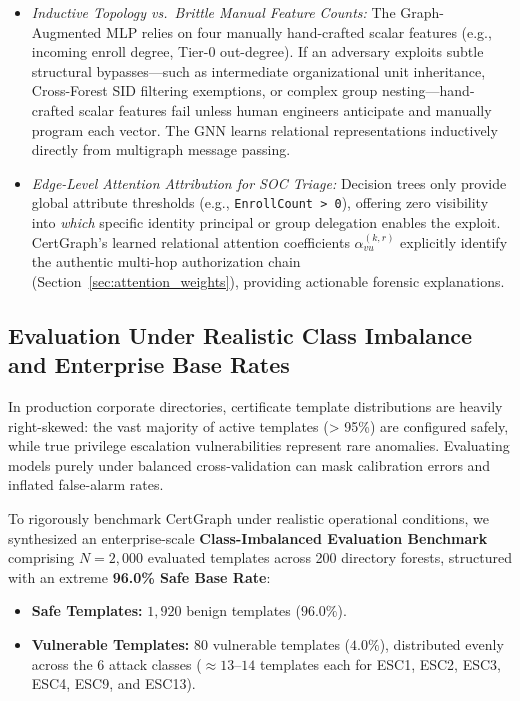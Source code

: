 \begin{enumerate}
\begin{itemize}
        \item \textit{Inductive Topology vs.\ Brittle Manual Feature Counts:} The Graph-Augmented MLP relies on four manually hand-crafted scalar features (e.g., incoming enroll degree, Tier-0 out-degree). If an adversary exploits subtle structural bypasses—such as intermediate organizational unit inheritance, Cross-Forest SID filtering exemptions, or complex group nesting—hand-crafted scalar features fail unless human engineers anticipate and manually program each vector. The GNN learns relational representations inductively directly from multigraph message passing.
        \item \textit{Edge-Level Attention Attribution for SOC Triage:} Decision trees only provide global attribute thresholds (e.g., \texttt{EnrollCount > 0}), offering zero visibility into \textit{which} specific identity principal or group delegation enables the exploit. CertGraph's learned relational attention coefficients $\alpha_{vu}^{(k, r)}$ explicitly identify the authentic multi-hop authorization chain (Section~\ref{sec:attention_weights}), providing actionable forensic explanations.
    \end{itemize}
\end{enumerate}

\subsection{Evaluation Under Realistic Class Imbalance and Enterprise Base Rates}
\label{sec:class_imbalance}
In production corporate directories, certificate template distributions are heavily right-skewed: the vast majority of active templates (> 95\%) are configured safely, while true privilege escalation vulnerabilities represent rare anomalies. Evaluating models purely under balanced cross-validation can mask calibration errors and inflated false-alarm rates.

To rigorously benchmark CertGraph under realistic operational conditions, we synthesized an enterprise-scale \textbf{Class-Imbalanced Evaluation Benchmark} comprising $N = 2{,}000$ evaluated templates across 200 directory forests, structured with an extreme \textbf{96.0\% Safe Base Rate}:
\begin{itemize}
    \item \textbf{Safe Templates:} $1{,}920$ benign templates ($96.0\%$).
    \item \textbf{Vulnerable Templates:} $80$ vulnerable templates ($4.0\%$), distributed evenly across the 6 attack classes ($\approx 13\text{--}14$ templates each for ESC1, ESC2, ESC3, ESC4, ESC9, and ESC13).
\end{itemize}

